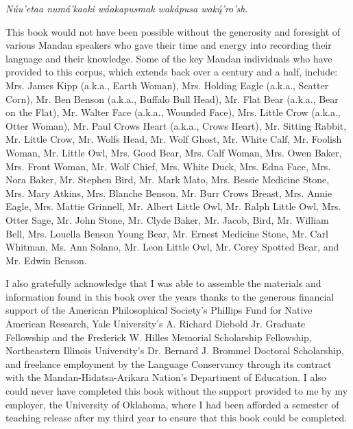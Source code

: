 \addchap{\lsAcknowledgementTitle} 

\textit{Núu'etaa numá'kaaki wáakapusmak wakápusa wakų́'ro'sh}. 

This book would not have been possible without the generosity and foresight of various Mandan speakers who gave their time and energy into recording their language and their knowledge. Some of the key Mandan individuals who have provided to this corpus, which extends back over a century and a half, include: Mrs. James Kipp (a.k.a., Earth Woman), Mrs. Holding Eagle (a.k.a., Scatter Corn), Mr. Ben Benson (a.k.a., Buffalo Bull Head), Mr. Flat Bear (a.k.a., Bear on the Flat), Mr. Walter Face (a.k.a., Wounded Face), Mrs. Little Crow (a.k.a., Otter Woman), Mr. Paul Crows Heart (a.k.a., Crows Heart), Mr. Sitting Rabbit, Mr. Little Crow, Mr. Wolfs Head, Mr. Wolf Ghost, Mr. White Calf, Mr. Foolish Woman, Mr. Little Owl, Mrs. Good Bear, Mrs. Calf Woman, Mrs. Owen Baker, Mrs. Front Woman, Mr. Wolf Chief, Mrs. White Duck, Mrs. Edna Face, Mrs. Nora Baker, Mr. Stephen Bird, Mr. Mark Mato, Mrs. Bessie Medicine Stone, Mrs. Mary Atkins, Mrs. Blanche Benson, Mr. Burr Crows Breast, Mrs. Annie Eagle, Mrs. Mattie Grinnell, Mr. Albert Little Owl, Mr. Ralph Little Owl, Mrs. Otter Sage, Mr. John Stone, Mr. Clyde Baker, Mr. Jacob, Bird, Mr. William Bell, Mrs. Louella Benson Young Bear, Mr. Ernest Medicine Stone, Mr. Carl Whitman, Ms. Ann Solano, Mr. Leon Little Owl, Mr. Corey Spotted Bear, and Mr. Edwin Benson.

I also gratefully acknowledge that I was able to assemble the materials and information found in this book over the years thanks to the generous financial support of the American Philosophical Society's Phillips Fund for Native American Research, Yale University's A. Richard Diebold Jr. Graduate Fellowship and the Frederick W. Hilles Memorial Scholarship Fellowship, Northeastern Illinois University's Dr. Bernard J. Brommel Doctoral Scholarship, and freelance employment by the Language Conservancy through its contract with the Mandan-Hidatsa-Arikara Nation's Department of Education. I also could never have completed this book without the support provided to me by my employer, the University of Oklahoma, where I had been afforded a semester of teaching release after my third year to ensure that this book could be completed.

